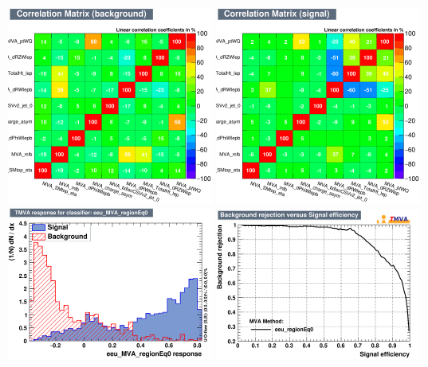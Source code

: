 \begin{figure}[htbp]
	\includegraphics[width=0.48\textwidth]{6_Search/Figures/MVAtechnics/singletopzut/eeu/CorrelationMatrixB.png}
	\includegraphics[width=0.48\textwidth]{6_Search/Figures/MVAtechnics/singletopzut/eeu/CorrelationMatrixS.png}
	\includegraphics[width=0.48\textwidth]{6_Search/Figures/MVAtechnics/singletopzut/eeu/mva_eeu_MVA_regionEq0.png}
	\includegraphics[width=0.48\textwidth]{6_Search/Figures/MVAtechnics/singletopzut/eeu/rejBvsS.png}

\end{figure}
